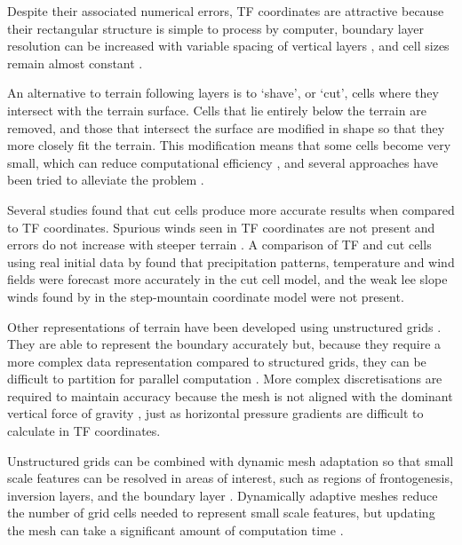 Despite their associated numerical errors, TF coordinates are attractive because their rectangular structure is simple to process by computer, boundary layer resolution can be increased with variable spacing of vertical layers \autocite{schaer2002}, and cell sizes remain almost constant \autocite{jebens2011}.

An alternative to terrain following layers is to `shave', or `cut', cells where they intersect with the terrain surface.  Cells that lie entirely below the terrain are removed, and those that intersect the surface are modified in shape so that they more closely fit the terrain.  This modification means that some cells become very small, which can reduce computational efficiency \autocite{klein2009}, and several approaches have been tried to alleviate the problem \parencites{steppeler2002}{yamazaki-satomura2010}{jebens2011}.

Several studies found that cut cells produce more accurate results when compared to TF coordinates.  Spurious winds seen in TF coordinates are not present and errors do not increase with steeper terrain \autocite{good2013}.  A comparison of TF and cut cells using real initial data by \textcite{steppeler2006} found that precipitation patterns, temperature and wind fields were forecast more accurately in the cut cell model, and the weak lee slope winds found by \textcite{gallus-klemp2000} in the step-mountain coordinate model were not present.  

Other representations of terrain have been developed using unstructured grids \parencites{ss2011}{pain2005}.  They are able to represent the boundary accurately but, because they require a more complex data representation compared to structured grids, they can be difficult to partition for parallel computation \autocite{steppeler2003}.  More complex discretisations are required to maintain accuracy because the mesh is not aligned with the dominant vertical force of gravity \autocite{rosatti2005}, just as horizontal pressure gradients are difficult to calculate in TF coordinates.

Unstructured grids can be combined with dynamic mesh adaptation so that small scale features can be resolved in areas of interest, such as regions of frontogenesis, inversion layers, and the boundary layer \autocite{browne2014}.  Dynamically adaptive meshes reduce the number of grid cells needed to represent small scale features, but updating the mesh can take a significant amount of computation time \parencites{blaise2012}{browne2014}.

